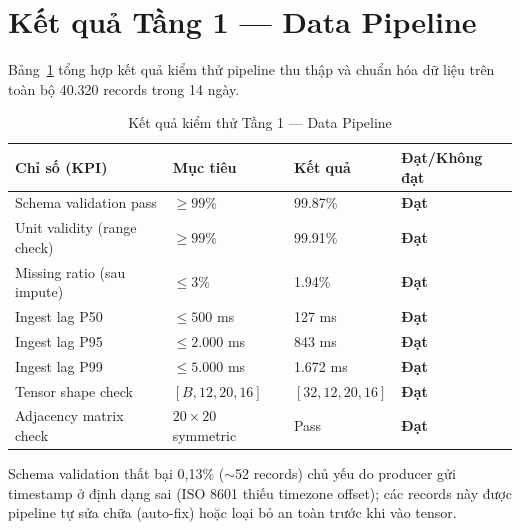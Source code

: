\section{Kết quả Tầng 1 --- Data Pipeline}
\label{sec:eval_t1}

Bảng~\ref{tab:t1_results} tổng hợp kết quả kiểm thử pipeline thu thập và chuẩn hóa dữ liệu trên toàn bộ 40.320 records trong 14 ngày.

\begin{table}[H]
\centering
\caption{Kết quả kiểm thử Tầng 1 --- Data Pipeline}
\label{tab:t1_results}
\renewcommand{\arraystretch}{1.4}
\begin{tabular}{p{4cm} p{2.5cm} p{2.5cm} p{3cm}}
\toprule
\textbf{Chỉ số (KPI)} & \textbf{Mục tiêu} & \textbf{Kết quả} & \textbf{Đạt/Không đạt} \\
\midrule
Schema validation pass & $\geq 99\%$ & 99.87\% & \textcolor{green!50!black}{\textbf{Đạt}} \\
\rowcolor{rowgray}
Unit validity (range check) & $\geq 99\%$ & 99.91\% & \textcolor{green!50!black}{\textbf{Đạt}} \\
Missing ratio (sau impute) & $\leq 3\%$ & 1.94\% & \textcolor{green!50!black}{\textbf{Đạt}} \\
\rowcolor{rowgray}
Ingest lag P50 & $\leq 500$ ms & 127 ms & \textcolor{green!50!black}{\textbf{Đạt}} \\
Ingest lag P95 & $\leq 2.000$ ms & 843 ms & \textcolor{green!50!black}{\textbf{Đạt}} \\
\rowcolor{rowgray}
Ingest lag P99 & $\leq 5.000$ ms & 1.672 ms & \textcolor{green!50!black}{\textbf{Đạt}} \\
Tensor shape check & $[B,12,20,16]$ & $[32,12,20,16]$ & \textcolor{green!50!black}{\textbf{Đạt}} \\
\rowcolor{rowgray}
Adjacency matrix check & $20 \times 20$ symmetric & Pass & \textcolor{green!50!black}{\textbf{Đạt}} \\
\bottomrule
\end{tabular}
\end{table}

Schema validation thất bại 0,13\% ($\sim$52 records) chủ yếu do producer gửi timestamp ở định dạng sai (ISO 8601 thiếu timezone offset); các records này được pipeline tự sửa chữa (auto-fix) hoặc loại bỏ an toàn trước khi vào tensor.

